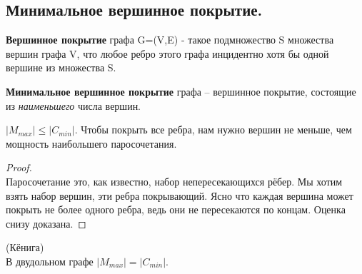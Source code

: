 \subsection*{Минимальное вершинное покрытие.}%
\label{sub:Минимальное вершинное покрытие.}

\begin{Def}
	\textbf{Вершинное покрытие} графа G=(V,E)  - такое подмножество S множества вершин графа V, что любое ребро этого графа инцидентно хотя бы одной вершине из множества S.
\end{Def}

\begin{Def}
	\textbf{Минимальное вершинное покрытие} графа -- вершинное покрытие, состоящие из \textit{наименьшего} числа вершин.
\end{Def}

\begin{prop}
	$\lvert M_{max} \rvert \leq \lvert C_{min} \rvert$.
	Чтобы покрыть все ребра, нам нужно вершин не меньше, чем мощность наибольшего паросочетания.
\end{prop}

\begin{proof} \ \\
	Паросочетание это, как известно, набор непересекающихся рёбер. Мы хотим взять набор вершин, эти ребра покрывающий. Ясно что каждая вершина может покрыть не более одного ребра, ведь они не пересекаются по концам. Оценка снизу доказана.
\end{proof}

\begin{theorem} (Кёнига) \\
	В двудольном графе $\lvert M_{max} \rvert = \lvert C_{min} \rvert$.
\end{theorem}


